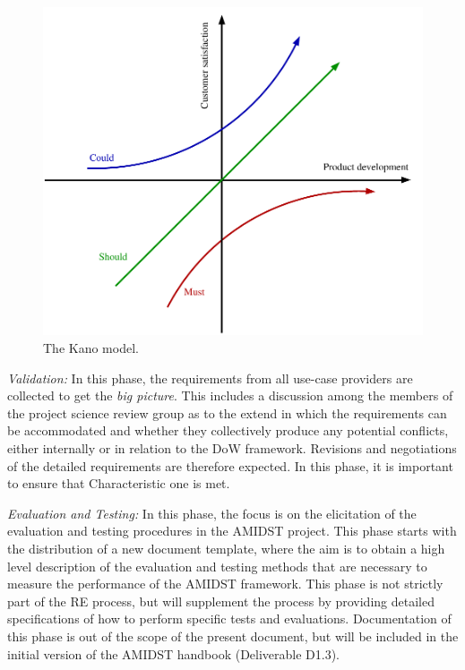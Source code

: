 \begin{figure}[htbp]
  \centering
  \includegraphics[width=0.75\linewidth]{kano}
  \caption{The Kano model.}
  \label{fig:kano}
\end{figure}


\emph{Validation:} In this phase, the requirements from all use-case providers are collected to get the \emph{big
  picture}.  This includes a discussion among the members of the  project science review group as to the extend in which the
requirements can be accommodated and whether they collectively produce any potential conflicts, either internally or in
relation to the
DoW framework. Revisions and negotiations of the detailed requirements are therefore expected.  In this phase, it is important to ensure that Characteristic one is met.

 \emph{Evaluation and Testing:} In this phase, the focus is on the elicitation of the evaluation and testing procedures
 in the AMIDST project. This phase starts with the distribution of a new document template, where the aim is to obtain a
 high level description of the evaluation and testing methods that are necessary to measure the performance of the AMIDST
 framework. This phase is not strictly part of the RE process, but will supplement the process by providing
 detailed specifications of how to perform specific tests and evaluations. Documentation of this phase is out of the scope of the present document, but will
 be included in the initial version of the AMIDST handbook (Deliverable D1.3).    


